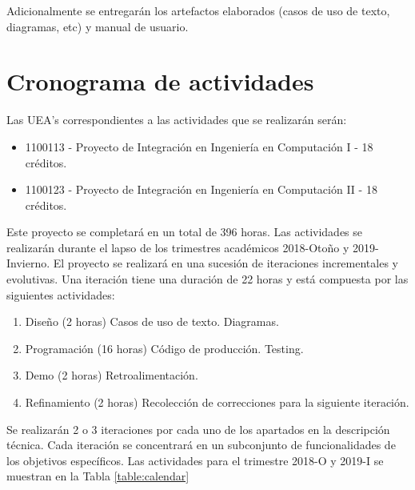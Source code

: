 Adicionalmente se entregar\'an los artefactos elaborados (casos de uso de texto, diagramas, etc) y manual de usuario.

\section{Cronograma de actividades}

Las UEA's correspondientes a las actividades que se realizar\'an serán:
\begin{itemize}
	\item 1100113 - Proyecto de Integración en Ingeniería en Computación I - 18 créditos.
	\item 1100123 - Proyecto de Integración en Ingeniería en Computación II - 18 créditos.
\end{itemize} 
 Este proyecto se completar\'a en un total de 396 horas. Las actividades se realizar\'an durante el lapso de los trimestres académicos 2018-Otoño y 2019-Invierno. El proyecto se realizará en una sucesión de iteraciones incrementales y evolutivas. Una iteración tiene una duración de 22 horas y est\'a compuesta por las siguientes actividades: 
\begin{enumerate}
	\item Diseño (2 horas)
	\subitem Casos de uso de texto.
	\subitem Diagramas.
	\item Programación (16 horas)
	\subitem Código de producción.
	\subitem Testing.
	\item Demo (2 horas)
	\subitem Retroalimentación.
	\item Refinamiento (2 horas)
	\subitem Recolección de correcciones para la siguiente iteración.
\end{enumerate}

Se realizarán 2 o 3 iteraciones por cada uno de los apartados en la descripción técnica. Cada iteración se concentrará en un subconjunto de funcionalidades de los objetivos específicos. 
Las actividades para el trimestre 2018-O y 2019-I se muestran en la Tabla \ref{table:calendar}

\newcommand\rownumber{\stepcounter{iteracion}\arabic{iteracion}}



